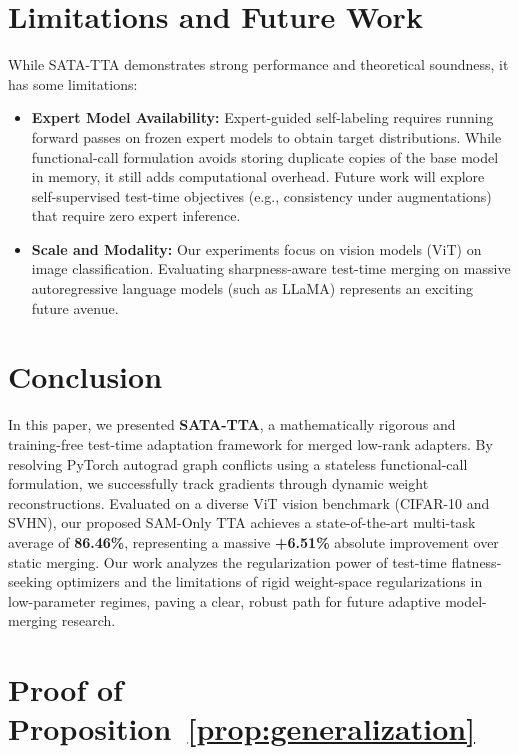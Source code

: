 \documentclass{article}
\theoremstyle{plain}
\theoremstyle{definition}
\theoremstyle{remark}
\begin{document}
\section{Limitations and Future Work}
\label{submission-limitations}

While SATA-TTA demonstrates strong performance and theoretical soundness, it has some limitations:
\begin{itemize}
  \item \textbf{Expert Model Availability:} Expert-guided self-labeling requires running forward passes on frozen expert models to obtain target distributions. While functional-call formulation avoids storing duplicate copies of the base model in memory, it still adds computational overhead. Future work will explore self-supervised test-time objectives (e.g., consistency under augmentations) that require zero expert inference.
  \item \textbf{Scale and Modality:} Our experiments focus on vision models (ViT) on image classification. Evaluating sharpness-aware test-time merging on massive autoregressive language models (such as LLaMA) represents an exciting future avenue.
\end{itemize}

\section{Conclusion}
\label{submission-conclusion}

In this paper, we presented \textbf{SATA-TTA}, a mathematically rigorous and training-free test-time adaptation framework for merged low-rank adapters. By resolving PyTorch autograd graph conflicts using a stateless functional-call formulation, we successfully track gradients through dynamic weight reconstructions. Evaluated on a diverse ViT vision benchmark (CIFAR-10 and SVHN), our proposed SAM-Only TTA achieves a state-of-the-art multi-task average of \textbf{86.46\%}, representing a massive \textbf{+6.51\%} absolute improvement over static merging. Our work analyzes the regularization power of test-time flatness-seeking optimizers and the limitations of rigid weight-space regularizations in low-parameter regimes, paving a clear, robust path for future adaptive model-merging research.

\nocite{*}



\clearpage
\appendix
\section{Proof of Proposition~\ref{prop:generalization}}
\label{appendix:proof}
\end{document}
